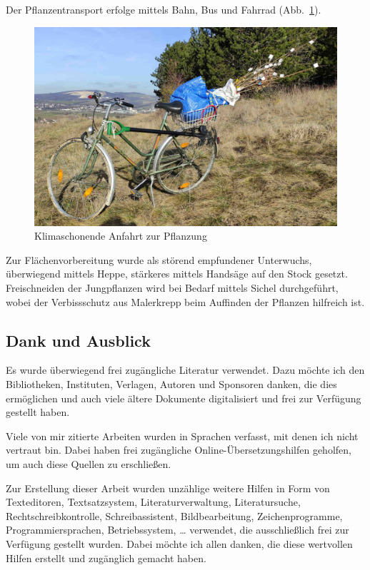 \documentclass[twocolumn]{scrartcl}
\begin{document}
Der Pflanzentransport erfolge mittels Bahn, Bus und Fahrrad
(Abb.~\ref{fig:fahrradPflanzung}).

\begin{figure}[htbp]
  \centering
  \includegraphics[width=.9\linewidth]{./bild/fahrradPflanzung}
  \caption{Klimaschonende Anfahrt zur Pflanzung}
  \label{fig:fahrradPflanzung}
\end{figure}

Zur Flächenvorbereitung wurde als störend empfundener Unterwuchs,
überwiegend mittels Heppe, stärkeres mittels Handsäge auf den Stock
gesetzt. Freischneiden der Jungpflanzen wird bei Bedarf mittels Sichel
durchgeführt, wobei der Verbissschutz aus Malerkrepp beim Auffinden
der Pflanzen hilfreich ist.

\subsection{Dank und Ausblick}

Es wurde überwiegend frei zugängliche Literatur verwendet. Dazu möchte
ich den Bibliotheken, Instituten, Verlagen, Autoren und Sponsoren
danken, die dies ermöglichen und auch viele ältere Dokumente
digitalisiert und frei zur Verfügung gestellt haben.

Viele von mir zitierte Arbeiten wurden in Sprachen verfasst, mit denen
ich nicht vertraut bin. Dabei haben frei zugängliche
Online-Übersetzungshilfen geholfen, um auch diese Quellen zu
erschließen.

Zur Erstellung dieser Arbeit wurden unzählige weitere Hilfen in Form
von Texteditoren, Textsatzsystem, Literaturverwaltung, Literatursuche,
Rechtschreibkontrolle, Schreibassistent, Bildbearbeitung,
Zeichenprogramme, Programmiersprachen, Betriebssystem, \dots
verwendet, die ausschließlich frei zur Verfügung gestellt
wurden. Dabei möchte ich allen danken, die diese wertvollen Hilfen
erstellt und zugänglich gemacht haben.
\end{document}
